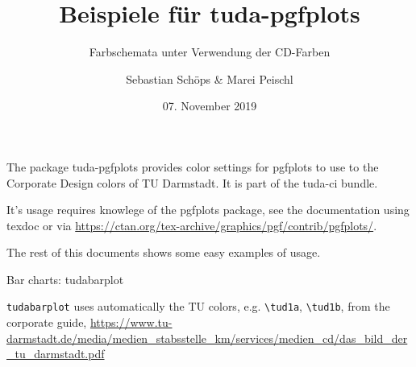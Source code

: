 \documentclass[
	ngerman,%
	aspectratio=169,%
	color={accentcolor=2d},
	logo=false,%
	colorframetitle=true,%
	]{tudabeamer}
\begin{document}
\title{Beispiele für tuda-pgfplots}
\subtitle{Farbschemata unter Verwendung der CD-Farben}
\author{Sebastian Schöps \& Marei Peischl}




\date{07. November 2019}

\maketitle

\begin{frame}

The package tuda-pgfplots provides color settings for pgfplots to use to the Corporate Design colors of TU Darmstadt. It is part of the tuda-ci bundle.

It's usage requires knowlege of the pgfplots package, see the documentation using texdoc or via \url{https://ctan.org/tex-archive/graphics/pgf/contrib/pgfplots/}.

The rest of this documents shows some easy examples of usage.

\end{frame}

\begin{frame}{Bar charts: tudabarplot}
\begin{figure}
\end{figure}
\tiny \texttt{tudabarplot} uses automatically the TU colors, e.g. \texttt{{\textbackslash}tud1a}, \texttt{{\textbackslash}tud1b}, from the corporate guide, \url{https://www.tu-darmstadt.de/media/medien_stabsstelle_km/services/medien_cd/das_bild_der_tu_darmstadt.pdf}
\end{frame}
\end{document}
